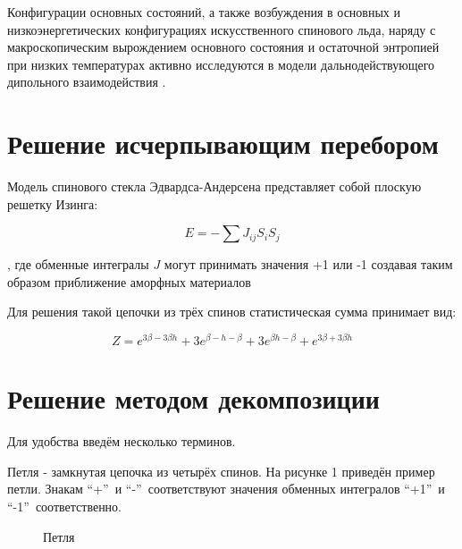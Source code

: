 \documentclass[utf8, babel, sor, jor, amsmath,amssymb, reprint]{elsarticle} %
\begin{document}
Конфигурации основных состояний, а также возбуждения в основных и низкоэнергетических конфигурациях искусственного спинового льда, наряду с макроскопическим вырождением основного состояния и остаточной энтропией  при низких температурах активно исследуются в модели дальнодействующего дипольного взаимодействия \cite{makarova2021low, singh2024micromagnetic}. 



\section{Решение исчерпывающим перебором}

Модель спинового стекла Эдвардса-Андерсена представляет собой плоскую решетку Изинга:

\begin{equation}
	E = -\sum J_{ij} S_i S_j
	\label{eq:ising_energy}
\end{equation}

, где обменные интегралы $J$ могут принимать значения +1 или -1 создавая таким образом приближение аморфных материалов

Для решения такой цепочки из трёх спинов статистическая сумма
принимает вид:

\begin{equation}
	Z = e^{3\beta - 3\beta h} + 3e^{\beta - h - \beta} + 3e^{\beta h - \beta} + e^{3\beta + 3\beta h}
	\label{eq:stat_3}
\end{equation}

\section{Решение методом декомпозиции}

Для удобства введём несколько терминов.

Петля - замкнутая цепочка из четырёх спинов. На рисунке 1 приведён пример петли. Знакам \textquotedblleft +\textquotedblright ~и   \textquotedblleft -\textquotedblright ~соответствуют значения обменных интегралов  \textquotedblleft +1\textquotedblright ~и \textquotedblleft -1\textquotedblright ~соответственно.

\begin{figure}[h]
	\centering
	\caption{Петля}
	\label{fig:petlya}
\end{figure}
\end{document}

